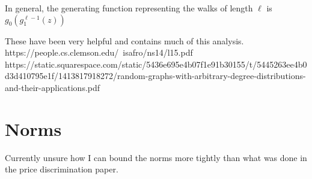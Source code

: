 \documentclass[11pt]{article}
\begin{document}
In general, the generating function representing the walks of length $\ell$ is $g_{0} ( g_{1}^{\ell-1} ( z))$


These have been very helpful and contains much of this analysis.
https://people.cs.clemson.edu/~isafro/ns14/l15.pdf
https://static.squarespace.com/static/5436e695e4b07f1e91b30155/t/5445263ee4b0d3d410795e1f/1413817918272/random-graphs-with-arbitrary-degree-distributions-and-their-applications.pdf

\section{Norms}
Currently unsure how I can bound the norms more tightly than what was done in the price discrimination paper.
\end{document}
